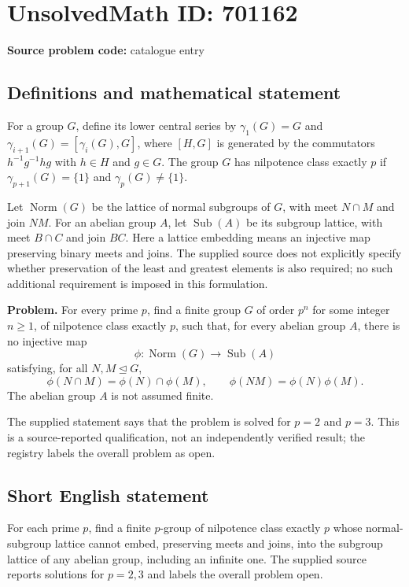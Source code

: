 \documentclass[11pt]{article}
\begin{document}
\section*{UnsolvedMath ID: 701162}
\textbf{Source problem code:} catalogue entry
\subsection{Definitions and mathematical statement}
For a group \(G\), define its lower central series by \(\gamma_1(G)=G\) and \(\gamma_{i+1}(G)=[\gamma_i(G),G]\), where \([H,G]\) is generated by the commutators \(h^{-1}g^{-1}hg\) with \(h\in H\) and \(g\in G\). The group \(G\) has nilpotence class exactly \(p\) if \(\gamma_{p+1}(G)=\{1\}\) and \(\gamma_p(G)\ne\{1\}\).

Let \(\operatorname{Norm}(G)\) be the lattice of normal subgroups of \(G\), with meet \(N\cap M\) and join \(NM\). For an abelian group \(A\), let \(\operatorname{Sub}(A)\) be its subgroup lattice, with meet \(B\cap C\) and join \(BC\). Here a lattice embedding means an injective map preserving binary meets and joins. The supplied source does not explicitly specify whether preservation of the least and greatest elements is also required; no such additional requirement is imposed in this formulation.

\textbf{Problem.} For every prime \(p\), find a finite group \(G\) of order \(p^n\) for some integer \(n\geq 1\), of nilpotence class exactly \(p\), such that, for every abelian group \(A\), there is no injective map
\[
\phi:\operatorname{Norm}(G)\longrightarrow\operatorname{Sub}(A)
\]
satisfying, for all \(N,M\trianglelefteq G\),
\[
\phi(N\cap M)=\phi(N)\cap\phi(M),\qquad
\phi(NM)=\phi(N)\phi(M).
\]
The abelian group \(A\) is not assumed finite.

The supplied statement says that the problem is solved for \(p=2\) and \(p=3\). This is a source-reported qualification, not an independently verified result; the registry labels the overall problem as open.
\subsection{Short English statement}
For each prime \(p\), find a finite \(p\)-group of nilpotence class exactly \(p\) whose normal-subgroup lattice cannot embed, preserving meets and joins, into the subgroup lattice of any abelian group, including an infinite one. The supplied source reports solutions for \(p=2,3\) and labels the overall problem open.
\end{document}
